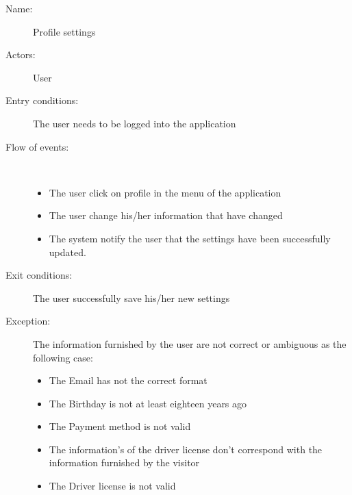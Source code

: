 \begin{description}
	\item[Name:] Profile settings
	\item[Actors:] User 
	\item[Entry conditions:] The user needs to be logged into the application
	\item[Flow of events:]  \ \\
		\begin{itemize}
			\item The user click on profile in the menu of the application
			\item The user change his/her information that have changed
			\item The system notify the user that the settings have been successfully updated.
		\end{itemize}
	\item[Exit conditions:] The user successfully save his/her new settings
	\item [Exception:] The information furnished by the user are not correct or ambiguous as the following case:
		\begin{itemize}
			\item The Email has not the correct format
			\item The Birthday is not at least eighteen years ago
			\item The Payment method is not valid
			\item The information's of the driver license don't correspond with the information furnished by the visitor
			\item The Driver license is not valid
		\end {itemize}
\end{description}
